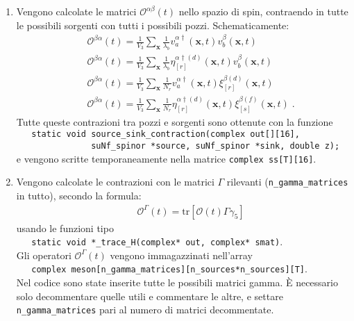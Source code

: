 \documentclass[a4paper]{article}
\newcommand{\tr}{\mathrm{tr}}
\newcommand{\point}{\; .}
\begin{document}
\begin{enumerate}
\item Vengono calcolate le matrici $\mathcal{O}^{\alpha\beta}(t)$ nello spazio di spin, contraendo in tutte le possibili sorgenti con tutti i possibili pozzi. Schematicamente:
\begin{eqnarray*}
&& \mathcal{O}^{\beta\alpha}(t) = \frac{1}{V_3} \sum_{\mathbf{x}} \frac{1}{\lambda_b} v^{\alpha\dagger}_a(\mathbf{x},t) v^\beta_b(\mathbf{x},t) \\
&& \mathcal{O}^{\beta\alpha}(t) = \frac{1}{V_3} \sum_{\mathbf{x}} \frac{1}{\lambda_b} \eta^{\alpha\dagger(d)}_{[r]}(\mathbf{x},t) v^\beta_b(\mathbf{x},t) \\
&& \mathcal{O}^{\beta\alpha}(t) = \frac{1}{V_3} \sum_{\mathbf{x}} \frac{1}{N_r} v^{\alpha\dagger}_a(\mathbf{x},t) \xi^{\beta(d)}_{[r]}(\mathbf{x},t) \\
&& \mathcal{O}^{\beta\alpha}(t) = \frac{1}{V_3} \sum_{\mathbf{x}} \frac{1}{N_r} \eta^{\alpha\dagger(d)}_{[r]}(\mathbf{x},t) \xi^{\beta(f)}_{[s]}(\mathbf{x},t) \point
\end{eqnarray*}
Tutte queste contrazioni tra pozzi e sorgenti sono ottenute con la funzione\\
\verb|   static void source_sink_contraction(complex out[][16],|\\
\verb|               suNf_spinor *source, suNf_spinor *sink, double z);|\\
e vengono scritte temporaneamente nella matrice \verb|complex ss[T][16]|. 

\item Vengono calcolate le contrazioni con le matrici $\Gamma$ rilevanti (\verb|n_gamma_matrices| in tutto), secondo la formula:
\begin{eqnarray*}
&& \mathcal{O}^\Gamma(t) = \tr \left[ \mathcal{O}(t) \Gamma \gamma_5 \right]
\end{eqnarray*}
usando le funzioni tipo\\
\verb|   static void *_trace_H(complex* out, complex* smat)|.\\
Gli operatori $\mathcal{O}^\Gamma(t)$ vengono immagazzinati nell'array\\
\verb|   complex meson[n_gamma_matrices][n_sources*n_sources][T]|.\\
Nel codice sono state inserite tutte le possibili matrici gamma. \`{E} necessario solo decommentare quelle utili e commentare le altre, e settare \verb|n_gamma_matrices| pari al numero di matrici decommentate.


\end{enumerate}
\end{document}
